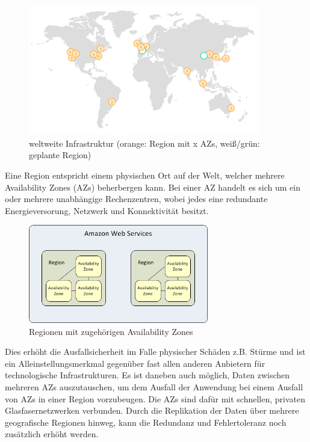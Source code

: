 \begin{figure}[!ht]
  \centering
  \includegraphics[width=0.9\textwidth]{images/regions.png}
  \caption{weltweite Infrastruktur (orange: Region mit x AZs, weiß/grün: geplante Region) \cite{aws:regions}}
\end{figure}

Eine Region entspricht einem physischen Ort auf der Welt, welcher mehrere Availability Zones (AZs) beherbergen kann. Bei einer AZ handelt es sich um ein oder mehrere unabhängige Rechenzentren, wobei jedes eine redundante Energieversorung, Netzwerk und Konnektivität besitzt.

\begin{figure}[!ht]
  \centering
  \includegraphics[width=0.7\textwidth]{images/azs_regions.png}
  \caption{Regionen mit zugehörigen Availability Zones \cite{aws:azs}}\label{figure:azs-regions}
\end{figure}

Dies erhöht die Ausfallsicherheit im Falle physischer Schäden z.B. Stürme und ist ein Alleinstellungsmerkmal gegenüber fast allen anderen Anbietern für technologische Infrastrukturen. Es ist daneben auch möglich, Daten zwischen mehreren AZs auszutauschen, um dem Ausfall der Anwendung bei einem Ausfall von AZs in einer Region vorzubeugen. Die AZs sind dafür mit schnellen, privaten Glasfasernetzwerken verbunden.
Durch die Replikation der Daten über mehrere geografische Regionen hinweg, kann die Redundanz und Fehlertoleranz noch zusätzlich erhöht werden.


